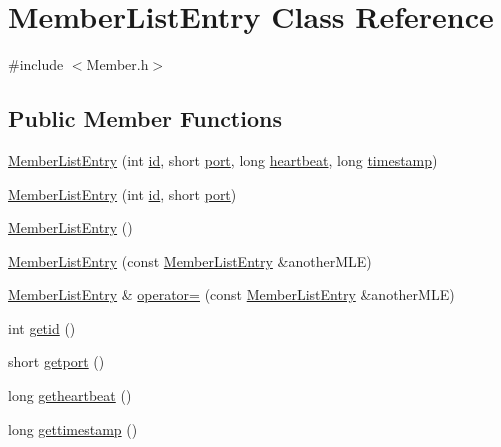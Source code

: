 \hypertarget{class_member_list_entry}{}\section{Member\+List\+Entry Class Reference}
\label{class_member_list_entry}


{\ttfamily \#include $<$Member.\+h$>$}

\subsection*{Public Member Functions}
\begin{DoxyCompactItemize}
\item 
\hyperlink{class_member_list_entry_ae96dafcf41fa55a43bbcb3f2a743e3bb}{Member\+List\+Entry} (int \hyperlink{class_member_list_entry_a569594f798c011bec978d7de9af9e87c}{id}, short \hyperlink{class_member_list_entry_ae85ba26966dc188c7fec4c298fb47a81}{port}, long \hyperlink{class_member_list_entry_ae01ac985a9a529b0046bc463e97b9a52}{heartbeat}, long \hyperlink{class_member_list_entry_ae15f1e7b93b9f19be264930c783615cc}{timestamp})
\item 
\hyperlink{class_member_list_entry_a7dc425a7913a0468b33277adeab9d522}{Member\+List\+Entry} (int \hyperlink{class_member_list_entry_a569594f798c011bec978d7de9af9e87c}{id}, short \hyperlink{class_member_list_entry_ae85ba26966dc188c7fec4c298fb47a81}{port})
\item 
\hyperlink{class_member_list_entry_a7d0e5b26b9dc655522b886a21b863254}{Member\+List\+Entry} ()
\item 
\hyperlink{class_member_list_entry_a598e8c2d3d3bf739ed5ec7c0b979ed0f}{Member\+List\+Entry} (const \hyperlink{class_member_list_entry}{Member\+List\+Entry} \&another\+M\+L\+E)
\item 
\hyperlink{class_member_list_entry}{Member\+List\+Entry} \& \hyperlink{class_member_list_entry_a36019bb9132966f4754db0a8b775875a}{operator=} (const \hyperlink{class_member_list_entry}{Member\+List\+Entry} \&another\+M\+L\+E)
\item 
int \hyperlink{class_member_list_entry_a3ff3ece6127fa1e69114f267719749ff}{getid} ()
\item 
short \hyperlink{class_member_list_entry_a5feb1389ab87715ac4450cbf38a813c7}{getport} ()
\item 
long \hyperlink{class_member_list_entry_a5d53c814f1ef40765cf4cf677a6e857d}{getheartbeat} ()
\item 
long \hyperlink{class_member_list_entry_a43ae4ad31cccb03ad3ad8d3be7ca0e94}{gettimestamp} ()

\end{DoxyCompactItemize}
